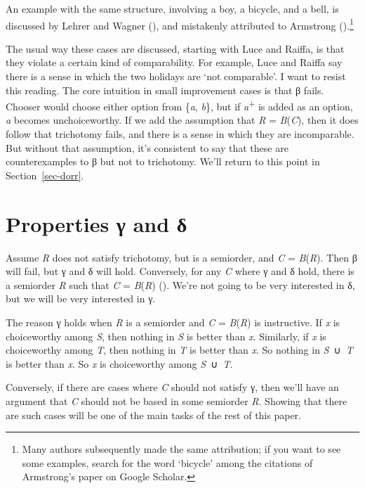 \documentclass[
  11pt,
  letterpaper,
  DIV=11,
  numbers=noendperiod,
  twoside]{scrartcl}
\begin{document}
An example with the same structure, involving a boy, a bicycle, and a
bell, is discussed by Lehrer and Wagner
(), and mistakenly attributed to
Armstrong ().\footnote{Many authors
  subsequently made the same attribution; if you want to see some
  examples, search for the word `bicycle' among the citations of
  Armstrong's paper on Google Scholar.}

The usual way these cases are discussed, starting with Luce and Raiffa,
is that they violate a certain kind of comparability. For example, Luce
and Raiffa say there is a sense in which the two holidays are `not
comparable'. I want to resist this reading. The core intuition in small
improvement cases is that β fails. Chooser would choose either option
from \{\emph{a}, \emph{b}\}, but if \emph{a}\textsuperscript{+} is added
as an option, \emph{a} becomes unchoiceworthy. If we add the assumption
that \emph{R} = \emph{B}(\emph{C}), then it does follow that trichotomy
fails, and there is a sense in which they are incomparable. But without
that assumption, it's consistent to say that these are counterexamples
to β but not to trichotomy. We'll return to this point in
Section~\ref{sec-dorr}.

\section{Properties γ and δ}\label{sec-gamma}

Assume \emph{R} does not satisfy trichotomy, but is a semiorder, and
\emph{C} = \emph{B}(\emph{R}). Then β will fail, but γ and δ will hold.
Conversely, for any \emph{C} where γ and δ hold, there is a semiorder
\emph{R} such that \emph{C} = \emph{B}(\emph{R})
(). We're not going
to be very interested in δ, but we will be very interested in γ.

The reason γ holds when \emph{R} is a semiorder and \emph{C} =
\emph{B}(\emph{R}) is instructive. If \emph{x} is choiceworthy among
\emph{S}, then nothing in \emph{S} is better than \emph{x}. Similarly,
if \emph{x} is choiceworthy among \emph{T}, then nothing in \emph{T} is
better than \emph{x}. So nothing in \emph{S}~∪~\emph{T} is better than
\emph{x}. So \emph{x} is choiceworthy among \emph{S}~∪~\emph{T}.

Conversely, if there are cases where \emph{C} should not satisfy γ, then
we'll have an argument that \emph{C} should not be based in some
semiorder \emph{R}. Showing that there are such cases will be one of the
main tasks of the rest of this paper.
\end{document}
